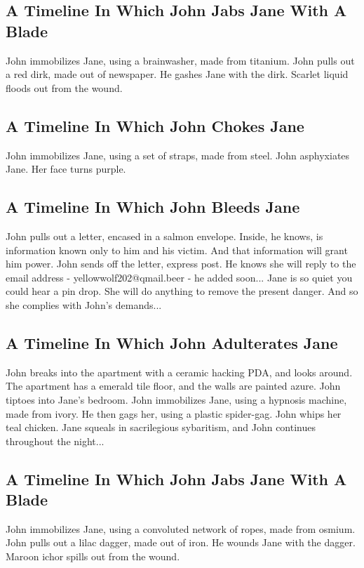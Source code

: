\documentclass{article}
\begin{document}
\subsection{A Timeline In Which John Jabs Jane With A Blade}


John immobilizes Jane, using a brainwasher, made from titanium.
John pulls out a red dirk, made out of newspaper.
He gashes Jane with the dirk.
Scarlet liquid floods out from the wound.
\subsection{A Timeline In Which John Chokes Jane}


John immobilizes Jane, using a set of straps, made from steel.
John asphyxiates Jane.
Her face turns purple.
\subsection{A Timeline In Which John Bleeds Jane}


John pulls out a letter, encased in a salmon envelope. Inside, he knows, is information known only to him and his victim. And that information will grant him power.
John sends off the letter, express post. He knows she will reply to the email address {-} yellowwolf202@qmail.beer {-} he added soon...
Jane is so quiet you could hear a pin drop. She will do anything to remove the present danger. And so she complies with John's demands...
\subsection{A Timeline In Which John Adulterates Jane}


John breaks into the apartment with a ceramic hacking PDA, and looks around.
The apartment has a emerald tile floor, and the walls are painted azure.
John tiptoes into Jane's bedroom.
John immobilizes Jane, using a hypnosis machine, made from ivory.
He then gags her, using a plastic spider{-}gag.
John whips her teal chicken.
Jane squeals in sacrilegious sybaritism, and John continues throughout the night...
\subsection{A Timeline In Which John Jabs Jane With A Blade}


John immobilizes Jane, using a convoluted network of ropes, made from osmium.
John pulls out a lilac dagger, made out of iron.
He wounds Jane with the dagger.
Maroon ichor spills out from the wound.
\end{document}
